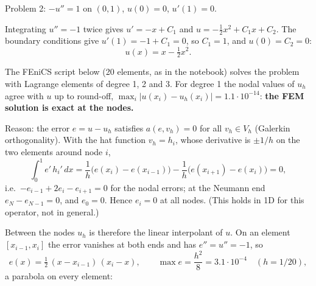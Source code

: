 




Problem 2: $-u'' = 1$ on $(0, 1)$, $u(0) = 0$, $u'(1) = 0$.

 Integrating $u'' = -1$ twice gives $u' = -x + C_1$ and $u = -\tfrac12 x^2 + C_1 x + C_2$. The boundary
conditions give $u'(1) = -1 + C_1 = 0$, so $C_1 = 1$, and $u(0) = C_2 = 0$:
\[
  u(x) = x - \tfrac12 x^2 .
\]

 The FEniCS script below (20 elements, as in the notebook) solves the problem with Lagrange elements of degree
1, 2 and 3. For degree 1 the nodal values of $u_h$ agree with $u$ up to round-off, $\max_i |u(x_i) - u_h(x_i)| =
1.1 \cdot 10^{-14}$: \textbf{the FEM solution is exact at the nodes.}

Reason: the error $e = u - u_h$ satisfies $a(e, v_h) = 0$ for all $v_h \in V_h$ (Galerkin orthogonality). With the
hat function $v_h = h_i$, whose derivative is $\pm 1/h$ on the two elements around node $i$,
\[
  \int_0^1 e'\, h_i' \, dx = \frac1h \big(e(x_i) - e(x_{i-1})\big) - \frac1h \big(e(x_{i+1}) - e(x_i)\big) = 0 ,
\]
i.e.\ $-e_{i-1} + 2 e_i - e_{i+1} = 0$ for the nodal errors; at the Neumann end $e_N - e_{N-1} = 0$, and $e_0 = 0$.
Hence $e_i = 0$ at all nodes. (This holds in 1D for this operator, not in general.)

Between the nodes $u_h$ is therefore the linear interpolant of $u$. On an element $[x_{i-1}, x_i]$ the error vanishes
at both ends and has $e'' = u'' = -1$, so
\[
  e(x) = \tfrac12\, (x - x_{i-1})\, (x_i - x), \qquad \max e = \frac{h^2}{8} = 3.1 \cdot 10^{-4} \quad (h = 1/20),
\]
a parabola on every element:

\begin{center}
\end{center}

